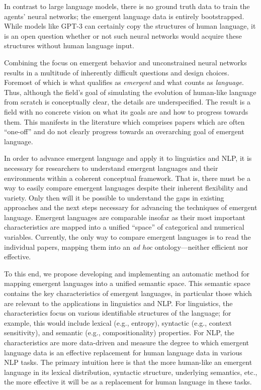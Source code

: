 In contrast to large language models,
    there is no ground truth data to train the agents' neural networks; the emergent language data is entirely bootstrapped.
While models like GPT-3 can certainly copy the structures of human language, it is an open question whether or not such neural networks would acquire these structures without human language input.

Combining the focus on emergent behavior and unconstrained neural networks results in a multitude of inherently difficult questions and design choices.
Foremost of which is what qualifies as \emph{emergent} and what counts as \emph{language}.
Thus, although the field's goal of simulating the evolution of human-like language from scratch is conceptually clear, the details are underspecified.
The result is a field with no concrete vision on what its goals are and how to progress towards them.
This manifests in the literature which comprises papers which are often ``one-off'' and do not clearly progress towards an overarching goal of emergent language.

In order to advance emergent language and apply it to linguistics and NLP, it is necessary for researchers to understand emergent languages and their environments within a coherent conceptual framework.
That is, there must be a way to easily compare emergent languages despite their inherent flexibility and variety.
Only then will it be possible to understand the gaps in existing approaches and the next steps necessary for advancing the techniques of emergent language.
Emergent languages are comparable insofar as their most important characteristics are mapped into a unified ``space'' of categorical and numerical variables.
Currently, the only way to compare emergent languages is to read the individual papers, mapping them into an \emph{ad hoc} ontology---neither efficient nor effective.

To this end, we propose developing and implementing an automatic method for mapping emergent languages  into a unified semantic space.
This semantic space contains the key characteristics of emergent languages, in particular those which are relevant to the applications in linguistics and NLP.\sentspace{}
For linguistics, the characteristics focus on various identifiable structures of the language; for example, this would include lexical (e.g., entropy), syntactic (e.g., context sensitivity), and semantic (e.g., compositionality) properties.
For NLP, the characteristics are more data-driven and measure the degree to which emergent language data is an effective replacement for human language data in various NLP tasks.
The primary intuition here is that the more human-like an emergent language in its lexical distribution, syntactic structure, underlying semantics, etc., the more effective it will be as a replacement for human language in these tasks.

